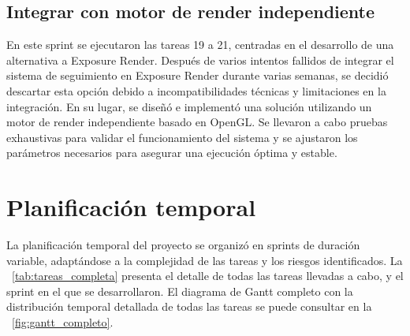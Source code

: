 \subsection{Integrar con motor de render independiente}
En este sprint se ejecutaron las tareas 19 a 21, centradas en el desarrollo de una alternativa a Exposure Render. Después de varios intentos fallidos de integrar el sistema de seguimiento en Exposure Render durante varias semanas, se decidió descartar esta opción debido a incompatibilidades técnicas y limitaciones en la integración. En su lugar, se diseñó e implementó una solución utilizando un motor de render independiente basado en OpenGL. Se llevaron a cabo pruebas exhaustivas para validar el funcionamiento del sistema y se ajustaron los parámetros necesarios para asegurar una ejecución óptima y estable.

\section{Planificación temporal}
La planificación temporal del proyecto se organizó en sprints de duración variable, adaptándose a la complejidad de las tareas y los riesgos identificados. La \tablename~\ref{tab:tareas_completa} presenta el detalle de todas las tareas llevadas a cabo, y el sprint en el que se desarrollaron. El diagrama de Gantt completo con la distribución temporal detallada de todas las tareas se puede consultar en la \tablename~\ref{fig:gantt_completo}.

